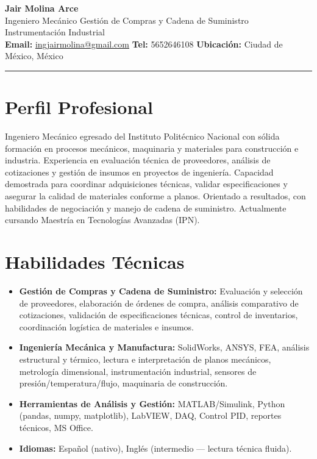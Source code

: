 \documentclass[11pt, a4paper]{article}
\begin{document}
{\LARGE\bfseries Jair Molina Arce}\\[2pt]
{\large Ingeniero Mec\'anico \textbar{} Gesti\'on de Compras y Cadena de Suministro \textbar{} Instrumentaci\'on Industrial}\\[5pt]
\small
\textbf{Email:} \href{mailto:ingjairmolina@gmail.com}{ingjairmolina@gmail.com}\quad
\textbf{Tel:} 5652646108\quad
\textbf{Ubicaci\'on:} Ciudad de M\'exico, M\'exico

\vspace{4pt}\hrule\vspace{6pt}

\section{Perfil Profesional}
Ingeniero Mec\'anico egresado del Instituto Polit\'ecnico Nacional con s\'olida formaci\'on
en procesos mec\'anicos, maquinaria y materiales para construcci\'on e industria.
Experiencia en evaluaci\'on t\'ecnica de proveedores, an\'alisis de cotizaciones y gesti\'on de
insumos en proyectos de ingenier\'ia. Capacidad demostrada para coordinar adquisiciones
t\'ecnicas, validar especificaciones y asegurar la calidad de materiales conforme a planos.
Orientado a resultados, con habilidades de negociaci\'on y manejo de cadena de suministro.
Actualmente cursando Maestr\'ia en Tecnolog\'ias Avanzadas (IPN).

\section{Habilidades T\'ecnicas}
\begin{itemize}[leftmargin=*, itemsep=2pt]
    \item \textbf{Gesti\'on de Compras y Cadena de Suministro:}
          Evaluaci\'on y selecci\'on de proveedores, elaboraci\'on de \'ordenes de compra,
          an\'alisis comparativo de cotizaciones, validaci\'on de especificaciones t\'ecnicas,
          control de inventarios, coordinaci\'on log\'istica de materiales e insumos.
    \item \textbf{Ingenier\'ia Mec\'anica y Manufactura:}
          SolidWorks, ANSYS, FEA, an\'alisis estructural y t\'ermico, lectura e interpretaci\'on
          de planos mec\'anicos, metrolog\'ia dimensional, instrumentaci\'on industrial,
          sensores de presi\'on/temperatura/flujo, maquinaria de construcci\'on.
    \item \textbf{Herramientas de An\'alisis y Gesti\'on:}
          MATLAB/Simulink, Python (pandas, numpy, matplotlib), LabVIEW, DAQ,
          Control PID, reportes t\'ecnicos, MS Office.
    \item \textbf{Idiomas:}
          Espa\~nol (nativo), Ingl\'es (intermedio --- lectura t\'ecnica fluida).
\end{itemize}
\end{document}
